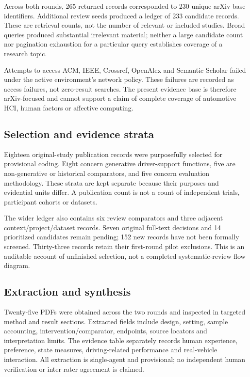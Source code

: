 \documentclass[11pt,a4paper]{article}
\begin{document}
Across both rounds, 265 returned records corresponded to 230 unique
arXiv base identifiers. Additional review seeds produced a ledger of 233
candidate records. These are retrieval counts, not the number of
relevant or included studies. Broad queries produced substantial
irrelevant material; neither a large candidate count nor pagination
exhaustion for a particular query establishes coverage of a research
topic.

Attempts to access ACM, IEEE, Crossref, OpenAlex and Semantic Scholar
failed under the active environment's network policy. These failures are
recorded as access failures, not zero-result searches. The present
evidence base is therefore arXiv-focused and cannot support a claim of
complete coverage of automotive HCI, human factors or affective
computing.

\subsection{Selection and evidence
strata}\label{selection-and-evidence-strata}

Eighteen original-study publication records were purposefully selected
for provisional coding. Eight concern generative driver-support
functions, five are non-generative or historical comparators, and five
concern evaluation methodology. These strata are kept separate because
their purposes and evidential units differ. A publication count is not a
count of independent trials, participant cohorts or datasets.

The wider ledger also contains six review comparators and three adjacent
context/project/dataset records. Seven original full-text decisions and
14 prioritized candidates remain pending; 152 new records have not been
formally screened. Thirty-three records retain their first-round pilot
exclusions. This is an auditable account of unfinished selection, not a
completed systematic-review flow diagram.

\subsection{Extraction and synthesis}\label{extraction-and-synthesis}

Twenty-five PDFs were obtained across the two rounds and inspected in
targeted method and result sections. Extracted fields include design,
setting, sample accounting, intervention/comparator, endpoints, source
locators and interpretation limits. The evidence table separately
records human experience, preference, state measures, driving-related
performance and real-vehicle interaction. All extraction is single-agent
and provisional; no independent human verification or inter-rater
agreement is claimed.
\end{document}
